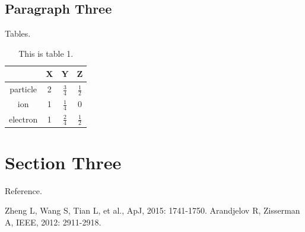 \documentclass[11pt, a4paper]{article}
\numberwithin{equation}{section} %
\begin{document}
\subsection{Paragraph Three}

Tables.

\begin{table}[h]
	\renewcommand\arraystretch{2}
	\centering
	\caption{This is table 1.}
	\begin{tabular}{|c|c|c|c|}
		\hline \        & X & Y             & Z             \\
		\hline particle & 2 & $\frac{3}{4}$ & $\frac{1}{2}$ \\
		\hline ion      & 1 & $\frac{1}{4}$ & 0             \\
		\hline electron & 1 & $\frac{2}{4}$ & $\frac{1}{2}$ \\
		\hline
	\end{tabular}
\end{table}

\section{Section Three}

Reference.

\begin{thebibliography}{99}  
Zheng L, Wang S, Tian L, et al., ApJ, 2015: 1741-1750.  
Arandjelov R, Zisserman A, IEEE, 2012: 2911-2918.  
\end{thebibliography}

\end{document}
